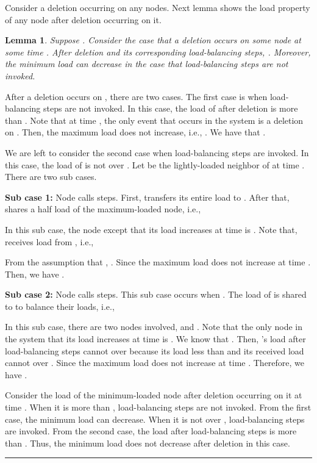 \documentclass[a4paper]{article}
\newtheorem{lemma}{Lemma}
\newenvironment{proof}{{\bf Proof:}}{\hfill\rule{1.5mm}{3mm}\vspace{0.1in}}
\begin{document}
Consider a deletion occurring on
any nodes. Next lemma shows the load property of any node after
deletion occurring on it.

\begin{lemma}\label{lem:delete-property}
  Suppose . Consider the case that a deletion occurs on
  some node  at some time .  After deletion and its corresponding
  load-balancing steps, . Moreover, the minimum
  load can decrease in the case that  load-balancing steps are not
  invoked.
\end{lemma}

\begin{proof}
  After a deletion occurs on , there are two cases.  The first case is when 
  load-balancing steps are not invoked. In this case, the load of
   after deletion is more than .  Note that at time
  , the only event that occurs in the system is a deletion on .
  Then, the maximum load does not increase, i.e., . We have that .
  
  We are left to consider the second case when  load-balancing
  steps are invoked.  In this case, the load of  is not over
  . Let  be the lightly-loaded neighbor of
   at time . There are two sub cases.

  \textbf{Sub case 1:} Node  calls {\splitmax} steps.  First, 
   transfers its entire load to .  After that,  shares a half 
  load of the maximum-loaded node, i.e., 
  
  In this sub case, the node except 
     that its load increases at time  is . Note
  that,  receives load from , i.e., 
  
    From the assumption that ,  . Since the maximum load does not increase
  at time .  Then, we have .

  \textbf{Sub case 2:} Node  calls {\splitnbr} steps. This sub case
  occurs when . The load of  is shared to
   to balance their loads, i.e., 
  
  In this sub case, there are two nodes involved,  and .  Note that the only node in
  the system that its load increases at time  is .  We know that
  . Then, 's load
  after  load-balancing steps cannot over  because its load
  less than  and its received load cannot over
  .  Since the maximum load does not increase
  at time .  Therefore, we have .
  
  Consider the load of the minimum-loaded node after deletion occurring on it at time
  . When it is more than ,  load-balancing steps
  are not invoked. From the first case, the minimum load can decrease.
  When it is not over ,  load-balancing steps
  are invoked. From the second case, the load after load-balancing
  steps is more than . Thus, the minimum load does not
  decrease after deletion in this case.
\end{proof}
\end{document}

